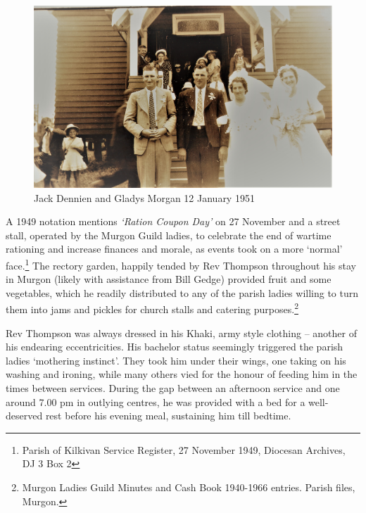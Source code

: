 \begin{figure}[!htb]
\begin{center}
\includegraphics[width=1.\textwidth,center]{../images/JackDennienGladysMorgan12Jan1951.jpg}
\caption{Jack Dennien and Gladys Morgan 12 January 1951}
\end{center}
\end{figure}




A 1949 notation mentions \emph{`Ration Coupon Day'} on 27 November and a street stall, operated by the Murgon Guild ladies, to celebrate the end of wartime rationing and increase finances and morale, as events took on a more `normal' face.\footnote{Parish of Kilkivan Service Register, 27 November 1949, Diocesan Archives, DJ 3 Box 2} The rectory garden, happily tended by Rev Thompson throughout his stay in Murgon (likely with assistance from Bill Gedge) provided fruit and some vegetables, which he readily distributed to any of the parish ladies willing to turn them into jams and pickles for church stalls and catering purposes.\footnote{Murgon Ladies Guild Minutes and Cash Book 1940-1966 entries. Parish files, Murgon.}


Rev Thompson was always dressed in his Khaki, army style clothing -- another of his endearing eccentricities. His bachelor status seemingly triggered the parish ladies `mothering instinct'. They took him under their wings, one taking on his washing and ironing, while many others vied for the honour of feeding him in the times between services. During the gap between an afternoon service and one around 7.00 pm in outlying centres, he was provided with a bed for a well-deserved rest before his evening meal, sustaining him till bedtime.



